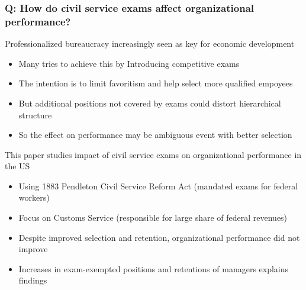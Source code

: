 \documentclass[aspectratio=169]{beamer}
\begin{document}
\begin{frame}
\frametitle{Q: How do civil service exams affect organizational performance?}
Professionalized bureaucracy increasingly seen as key for economic development
\begin{itemize}\setlength\itemsep{3pt}
\item Many tries to achieve this by Introducing competitive exams
\item The intention is to limit favoritism and help select more qualified empoyees
\item But additional positions not covered by exams could distort hierarchical structure
\item So the effect on performance may be ambiguous event with better selection
\end{itemize}\medskip
This paper studies impact of civil service exams on organizational performance in the US
\begin{itemize}\setlength\itemsep{3pt}
\item Using 1883 Pendleton Civil Service Reform Act (mandated exams for federal workers)
\item Focus on Customs Service (responsible for large share of federal revenues)
\item Despite improved selection and retention, organizational performance did not improve
\item Increases in exam-exempted positions and retentions of managers explains findings
\end{itemize}
\end{frame}
\end{document}
